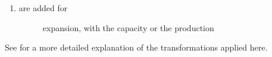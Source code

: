 \documentclass[letterpaper,10pt,english]{sphinxmanual}
\begin{document}
\begin{fulllineitems}
\begin{enumerate}
\begin{description}
\end{description}

\item {} \begin{description}
\item[{ are added for}] \leavevmode
expansion, with  the capacity or the production

\end{description}

\end{enumerate}

See  for a more detailed explanation
of the transformations applied here.

\end{fulllineitems}

\end{document}
